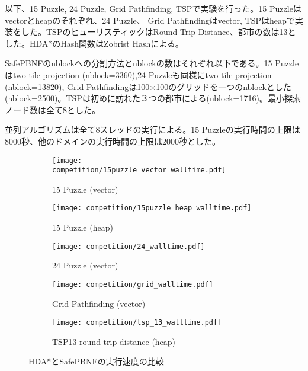 \documentclass[uplatex]{jsarticle}
\begin{document}
以下、15 Puzzle, 24 Puzzle, Grid Pathfinding, TSPで実験を行った。15 Puzzleはvectorとheapのそれぞれ、24 Puzzle、 Grid Pathfindingはvector, TSPはheapで実装をした。TSPのヒューリスティックはRound Trip Distance、都市の数は13とした。HDA*のHash関数はZobrist Hashによる。

SafePBNFのnblockへの分割方法とnblockの数はそれぞれ以下である。15 Puzzleはtwo-tile projection (nblock=3360),24 Puzzleも同様にtwo-tile projection (nblock=13820), Grid Pathfindingは100$\times$100のグリッドを一つのnblockとした(nblock=2500)。TSPは初めに訪れた３つの都市による(nblock=1716)。最小探索ノード数は全て8とした。

並列アルゴリズムは全て8スレッドの実行による。15 Puzzleの実行時間の上限は8000秒、他のドメインの実行時間の上限は2000秒とした。
\newline

\begin{figure}[h]
	\centering
	\begin{subfigure}{0.4\columnwidth}
		\texttt{[image: competition/15puzzle\_vector\_walltime.pdf]}
		\caption{15 Puzzle (vector)}
		\label{fig:15puzzle_vector}
	\end{subfigure}
	\begin{subfigure}{0.4\columnwidth}
		\texttt{[image: competition/15puzzle\_heap\_walltime.pdf]}
		\caption{15 Puzzle (heap)}
		\label{fig:15puzzle_heap}
	\end{subfigure}
	\begin{subfigure}{0.4\columnwidth}
		\texttt{[image: competition/24\_walltime.pdf]}
		\caption{24 Puzzle (vector)}
		\label{fig:24puzzle_vector}
	\end{subfigure}
	\begin{subfigure}{0.4\columnwidth}
		\texttt{[image: competition/grid\_walltime.pdf]}
		\caption{Grid Pathfinding (vector)}
		\label{fig:grid}
	\end{subfigure}
	\begin{subfigure}{0.4\columnwidth}
		\texttt{[image: competition/tsp\_13\_walltime.pdf]}
		\caption{TSP13 round trip distance (heap)}
		\label{fig:tsp_13}
	\end{subfigure}
	\caption{HDA*とSafePBNFの実行速度の比較}
	\label{fig:comparison}
\end{figure}
\end{document}
